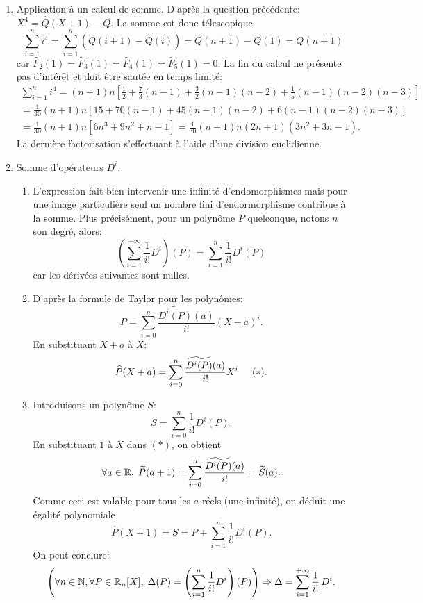 \begin{enumerate}
 \item Application à un calcul de somme. D'après la question précédente: $X^4 = \widehat{Q}(X+1) - Q$. La somme est donc télescopique
 \[
  \sum_{i=1}^{n}i^4
  = \sum_{i=1}^{n}\left( \widetilde{Q}(i+1) - \widetilde{Q}(i)\right) 
  = \widetilde{Q}(n+1) - \widetilde{Q}(1) 
  = \widetilde{Q}(n+1)
 \]
car $\widetilde{F_2}(1)=\widetilde{F_3}(1)=\widetilde{F_4}(1)=\widetilde{F_5}(1)=0$. \newline
La fin du calcul ne présente pas d'intérêt et doit être sautée en temps limité:
\begin{multline*}
 \sum_{i=1}^{n}i^4 = (n+1)n\left[\frac{1}{2} + \frac{7}{3}(n-1) + \frac{3}{2}(n-1)(n-2) + \frac{1}{5}(n-1)(n-2)(n-3) \right] \\
 = \frac{1}{30}(n+1)n\left[ 15 + 70(n-1) + 45(n-1)(n-2) + 6(n-1)(n-2)(n-3)\right]\\
 = \frac{1}{30}(n+1)n\left[ 6n^3 + 9n^2 +n -1\right]
 = \frac{1}{30}(n+1)n(2n+1)(3n^2+3n-1).
\end{multline*}
La dernière factorisation s'effectuant à l'aide d'une division euclidienne.
 
 \item Somme d'opérateurs $D^i$.
 \begin{enumerate}
  \item L'expression fait bien intervenir une infinité d'endomorphismes mais pour une image particulière seul un nombre fini d'endormorphisme contribue à la somme. Plus précisément, pour un polynôme $P$ quelconque, notons $n$ son degré, alors:
\[
 \left( \sum_{i=1}^{+\infty}\frac{1}{i!}D^i\right)(P) = \sum_{i=1}^{n}\frac{1}{i!}D^i(P) 
\]
car les dérivées suivantes sont nulles.

  \item D'après la formule de Taylor pour les polynômes:
\[
 P = \sum_{i=0}^{n}\frac{\widetilde{D^i(P)}(a)}{i!}(X-a)^i.
\]
En substituant $X+a$ à $X$:
\[
 \widehat{P}(X+a) = \sum_{i=0}^{n}\frac{\widetilde{D^i(P)}(a)}{i!}X^i \hspace{0.5cm}(*).
\]
  \item Introduisons un polynôme $S$:
\[
 S = \sum_{i=0}^{n}\frac{1}{i!}D^i(P).
\]
En substituant $1$ à $X$ dans $(*)$, on obtient
\[
 \forall a \in \mathbb{R}, \; \widetilde{P}(a+1) = \sum_{i=0}^{n}\frac{\widetilde{D^i(P)}(a)}{i!} = \widetilde{S}(a).
\]
Comme ceci est valable pour tous les $a$ réels (une infinité), on déduit une égalité polynomiale
\[
 \widehat{P}(X+1) = S = P + \sum_{i=1}^n \frac{1}{i!}D^i(P).
\]
On peut conclure:
\[
 \left( \forall n \in \mathbb{N}, \forall P \in \mathbb{R}_n[X],\; \Delta(P) = \left(\sum_{i=1}^{n} \frac{1}{i!}D^i\right) (P)\right) 
 \Rightarrow \Delta = \sum_{i=1}^{+\infty} \frac{1}{i!}\,D^i.
\]
 \end{enumerate}


\end{enumerate}
